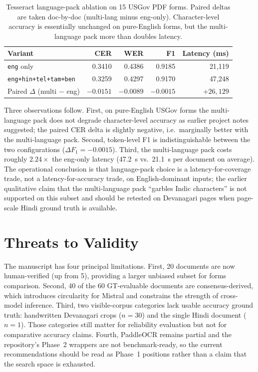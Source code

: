 \documentclass[conference]{IEEEtran}
\begin{document}
\begin{table}[t]
\centering
\caption{Tesseract language-pack ablation on 15 USGov PDF forms. Paired deltas are taken doc-by-doc (multi-lang minus eng-only). Character-level accuracy is essentially unchanged on pure-English forms, but the multi-language pack more than doubles latency.}
\label{tab:tesseract-lang}
\footnotesize
\begin{tabular}{lrrrr}
\toprule
\textbf{Variant} & \textbf{CER} & \textbf{WER} & \textbf{F1} & \textbf{Latency (ms)} \\
\midrule
\texttt{eng} only                & 0.3410 & 0.4386 & 0.9185 & 21{,}119 \\
\texttt{eng+hin+tel+tam+ben}     & 0.3259 & 0.4297 & 0.9170 & 47{,}248 \\
\midrule
Paired $\Delta$ (multi $-$ eng) & $-0.0151$ & $-0.0089$ & $-0.0015$ & $+26{,}129$ \\
\bottomrule
\end{tabular}
\end{table}

Three observations follow. First, on pure-English USGov forms the multi-language pack does not degrade character-level accuracy as earlier project notes suggested; the paired CER delta is slightly negative, i.e.\ marginally better with the multi-language pack. Second, token-level F1 is indistinguishable between the two configurations ($\Delta F_1 = -0.0015$). Third, the multi-language pack costs roughly $2.24\times$ the eng-only latency (47.2~s vs.\ 21.1~s per document on average). The operational conclusion is that language-pack choice is a latency-for-coverage trade, not a latency-for-accuracy trade, on English-dominant inputs; the earlier qualitative claim that the multi-language pack ``garbles Indic characters'' is not supported on this subset and should be retested on Devanagari pages when page-scale Hindi ground truth is available.

\section{Threats to Validity}

The manuscript has four principal limitations. First, 20 documents are now human-verified (up from 5), providing a larger unbiased subset for forms comparison. Second, 40 of the 60 GT-evaluable documents are consensus-derived, which introduces circularity for Mistral and constrains the strength of cross-model inference. Third, two visible-corpus categories lack usable accuracy ground truth: handwritten Devanagari crops ($n=30$) and the single Hindi document ($n=1$). Those categories still matter for reliability evaluation but not for comparative accuracy claims. Fourth, PaddleOCR remains partial and the repository's Phase~2 wrappers are not benchmark-ready, so the current recommendations should be read as Phase~1 positions rather than a claim that the search space is exhausted.
\end{document}
